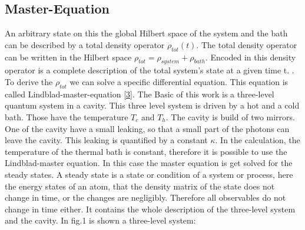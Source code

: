 \documentclass[12pt,a4paper]{article}
\begin{document}
\subsection{Master-Equation} 
An arbitrary state on this the global Hilbert space of the system and the bath can be described by a total density operator $\rho_{tot}(t)$. The total density operator can be written in the Hilbert space $ \rho_ {tot}= \rho_{system}+\rho_{bath}$.  Encoded in this density 
operator is a complete description of the total system's state at a given time t. \cite{Li2017}. To derive the $\rho_{tot}$ we can solve a specific differential equation. This equation is called Lindblad-master-equation \eqref{3}. 
The Basic of this work is a three-level quantum system in a cavity. This three level system is driven by a hot and a cold bath. Those have the temperature $T_c$ and $T_h$. The cavity is build of two mirrors. One of the cavity have a small leaking, so that a small part of the photons can leave the cavity. This leaking is quantified by a constant $\kappa$.
In the calculation, the temperature of the thermal bath is constant, therefore 
it is possible to use the Lindblad-master equation. 
In this case the master equation is get solved for the steady states.
A steady state is a state or condition of a system or process, here the energy states of an atom, that the density matrix of the state does not change in time, or the changes are negligibly. Therefore all observables do not change in time either. 
It contains the whole description of the three-level system and the cavity.
In fig.1 is shown a three-level system:
\newpage
\end{document}
